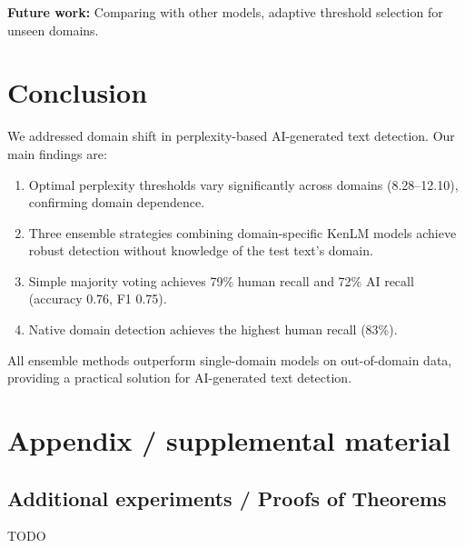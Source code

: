 \documentclass{article}
\begin{document}
\textbf{Future work:} Comparing with other models,  adaptive threshold selection for unseen domains.

\section{Conclusion}

We addressed domain shift in perplexity-based AI-generated text detection. Our main findings are:

\begin{enumerate}
    \item Optimal perplexity thresholds vary significantly across domains (8.28–12.10), confirming domain dependence.
    \item Three ensemble strategies combining domain-specific KenLM models achieve robust detection without knowledge of the test text's domain.
    \item Simple majority voting achieves 79\% human recall and 72\% AI recall (accuracy 0.76, F1 0.75).
    \item Native domain detection achieves the highest human recall (83\%).
\end{enumerate}

All ensemble methods outperform single-domain models on out-of-domain data, providing a practical solution for AI-generated text detection.







\newpage
\appendix
\section{Appendix / supplemental material}\label{app}

\subsection{Additional experiments / Proofs of Theorems}\label{app:exp}

TODO
\end{document}
